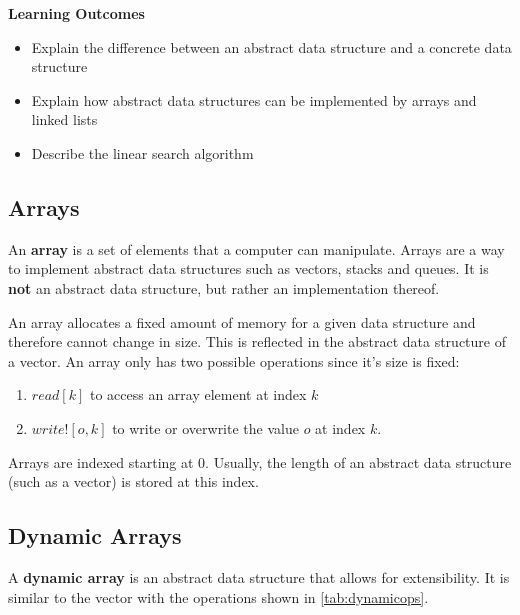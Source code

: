 	\begin{mdframed}
		\textbf{Learning Outcomes}
		\begin{itemize}[label={\checkmark}]
			\item Explain the difference between an abstract data structure and a concrete data structure
			\item Explain how abstract data structures can be implemented by arrays and linked lists
			\item Describe the linear search algorithm
		\end{itemize}
		\end{mdframed}

	\subsection{Arrays}
	An \textbf{array} is a set of elements that a computer can manipulate. Arrays are a way to implement abstract data structures such as vectors, stacks and queues. It is \textbf{not} an abstract data structure, but rather an implementation thereof.

	An array allocates a fixed amount of memory for a given data structure and therefore cannot change in size. This is reflected in the abstract data structure of a vector. An array only has two possible operations since it's size is fixed:

	\begin{enumerate}
		\item \( read[k] \) to access an array element at index \( k \)   
		\item \( write![o,k] \) to write or overwrite the value \( o \) at index \( k \).
	\end{enumerate}

	Arrays are indexed starting at 0. Usually, the length of an abstract data structure (such as a vector) is stored at this index.

	\subsection{Dynamic Arrays}
	
	A \textbf{dynamic array} is an abstract data structure that allows for extensibility. It is similar to the vector with the operations shown in \autoref{tab:dynamicops}.

